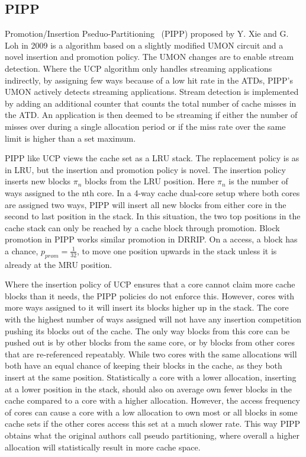 
\subsection{PIPP}
\label{sec:background:algorithms:pipp}

Promotion/Insertion Pseduo-Partitioning~\cite{Xie2009} (PIPP) proposed by Y. Xie and G. Loh in 2009 is a algorithm based on a slightly modified UMON circuit and a novel insertion and promotion policy.
The UMON changes are to enable stream detection.
Where the UCP algorithm only handles streaming applications indirectly, by assigning few ways because of a low hit rate in the ATDs, PIPP's UMON actively detects streaming applications.
Stream detection is implemented by adding an additional counter that counts the total number of cache misses in the ATD.
An application is then deemed to be streaming if either the number of misses over during a single allocation period or if the miss rate over the same limit is higher than a set maximum.

PIPP like UCP views the cache set as a LRU stack.
The replacement policy is as in LRU, but the insertion and promotion policy is novel.
The insertion policy inserts new blocks $\pi_n$ blocks from the LRU position. 
Here $\pi_n$ is the number of ways assigned to the nth core.
In a 4-way cache dual-core setup where both cores are assigned two ways, PIPP will insert all new blocks from either core in the second to last position in the stack. 
In this situation, the two top positions in the cache stack can only be reached by a cache block through promotion.
Block promotion in PIPP works similar promotion in DRRIP. 
On a access, a block has a chance, $p_{prom} = \frac{1}{32}$, to move one position upwards in the stack unless it is already at the MRU position.

Where the insertion policy of UCP ensures that a core cannot claim more cache blocks than it needs, the PIPP policies do not enforce this.
However, cores with more ways assigned to it will insert its blocks higher up in the stack. 
The core with the highest number of ways assigned will not have any insertion competition pushing its blocks out of the cache.
The only way blocks from this core can be pushed out is by other blocks from the same core, or by blocks from other cores that are re-referenced repeatably.
While two cores with the same allocations will both have an equal chance of keeping their blocks in the cache, as they both insert at the same position.
Statistically a core with a lower allocation, inserting at a lower position in the stack, should also on average own fewer blocks in the cache compared to a core with a higher allocation.
However, the access frequency of cores can cause a core with a low allocation to own most or all blocks in some cache sets if the other cores access this set at a much slower rate.
This way PIPP obtains what the original authors call pseudo partitioning, where overall a higher allocation will statistically result in more cache space.

